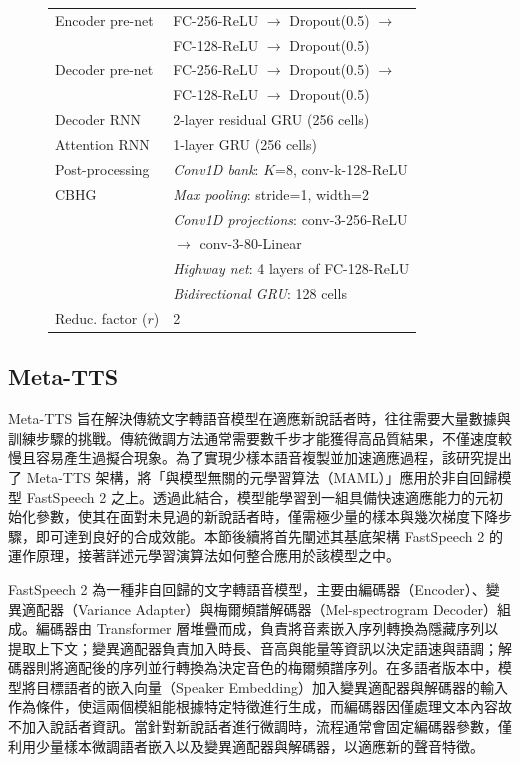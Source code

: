 \begin{figure}[H]
\begin{minipage}[H]{0.5\textwidth}
\begin{tabular}{|l|l|}
    Encoder pre-net   & FC-256-ReLU $\rightarrow$ Dropout(0.5) $\rightarrow$ \\
                      & FC-128-ReLU $\rightarrow$ Dropout(0.5) \\ \hline
    Decoder pre-net   & FC-256-ReLU $\rightarrow$ Dropout(0.5) $\rightarrow$ \\
                      & FC-128-ReLU $\rightarrow$ Dropout(0.5) \\ \hline
    Decoder RNN       & 2-layer residual GRU (256 cells) \\ \hline
    Attention RNN     & 1-layer GRU (256 cells) \\ \hline
    Post-processing   & \emph{Conv1D bank}: $K$=8, conv-k-128-ReLU \\
    CBHG              & \emph{Max pooling}: stride=1, width=2 \\
                      & \emph{Conv1D projections}: conv-3-256-ReLU \\
                      & $\rightarrow$ conv-3-80-Linear \\
                      & \emph{Highway net}: 4 layers of FC-128-ReLU \\
                      & \emph{Bidirectional GRU}: 128 cells \\ \hline
    Reduc. factor ($r$) & 2 \\ \hline
    \end{tabular}
    \label{tb.params}
  \end{minipage}
\end{figure}

\clearpage

\subsection{Meta-TTS}

Meta-TTS 旨在解決傳統文字轉語音模型在適應新說話者時，往往需要大量數據與訓練步驟的挑戰。傳統微調方法通常需要數千步才能獲得高品質結果，不僅速度較慢且容易產生過擬合現象。為了實現少樣本語音複製並加速適應過程，該研究提出了 Meta-TTS 架構，將「與模型無關的元學習算法（MAML）\cite{finn2017maml}」應用於非自回歸模型 FastSpeech 2 之上。透過此結合，模型能學習到一組具備快速適應能力的元初始化參數，使其在面對未見過的新說話者時，僅需極少量的樣本與幾次梯度下降步驟，即可達到良好的合成效能。本節後續將首先闡述其基底架構 FastSpeech 2 的運作原理，接著詳述元學習演算法如何整合應用於該模型之中。

FastSpeech 2 \cite{ren2021fastspeech}為一種非自回歸的文字轉語音模型，主要由編碼器（Encoder）、變異適配器（Variance Adapter）與梅爾頻譜解碼器（Mel-spectrogram Decoder）組成。編碼器由 Transformer 層堆疊而成，負責將音素嵌入序列轉換為隱藏序列以提取上下文；變異適配器負責加入時長、音高與能量等資訊以決定語速與語調；解碼器則將適配後的序列並行轉換為決定音色的梅爾頻譜序列。在多語者版本中，模型將目標語者的嵌入向量（Speaker Embedding）加入變異適配器與解碼器的輸入作為條件，使這兩個模組能根據特定特徵進行生成，而編碼器因僅處理文本內容故不加入說話者資訊。當針對新說話者進行微調時，流程通常會固定編碼器參數，僅利用少量樣本微調語者嵌入以及變異適配器與解碼器，以適應新的聲音特徵。

